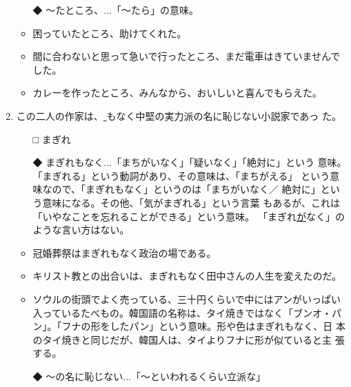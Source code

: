 \documentclass[
uplatex,
b5paper,
10pt,
dvipdfmx
]{jsbook}
\begin{document}
\begin{enumerate}
 \begin{itemize}
  \item[◆] 〜たところ、...「〜たら」の意味。
 \end{itemize}

\begin{itemize}
 \item 困っていたところ、助けてくれた。
 \item 間に合わないと思って急いで行ったところ、まだ電車はきていませんで
       した。
 \item カレーを作ったところ、みんなから、おいしいと喜んでもらえた。
\end{itemize}


 \item この二人の作家は、\underline{   }もなく中堅の実力派の名に恥じない小説家であっ
       た。 

 \begin{itemize}
  \item[□] まぎれ
  \item[◆] まぎれもなく...「まちがいなく」「疑いなく」「絶対に」という
	    意味。「まぎれる」という動詞があり、その意味は、「まちがえる」
	    という意味なので、「まぎれもなく」というのは「まちがいなく／
	    絶対に」という意味になる。その他、「気がまぎれる」という言葉
	    もあるが、これは「いやなことを忘れることができる」という意味。
	    「まぎれ\underline{が}なく」のような言い方はない。
 \end{itemize}

 \begin{itemize}
  \item 冠婚葬祭はまぎれもなく政治の場である。
  \item キリスト教との出合いは、まぎれもなく田中さんの人生を変えたのだ。
  \item ソウルの街頭でよく売っている、三十円くらいで中にはアンがいっぱい
	入っているたべもの。韓国語の名称は、タイ焼きではなく「ブンオ・パ
	ン」。「フナの形をしたパン」という意味。形や色はまぎれもなく、日
	本のタイ焼きと同じだが、韓国人は、タイよりフナに形が似ていると主
	張する。
 \end{itemize}

 \begin{itemize}
  \item[◆] 〜の名に恥じない...「〜といわれるくらい立派な」
 \end{itemize}


\end{enumerate}
\end{document}

